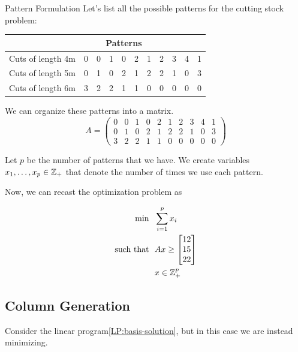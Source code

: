 \begin{example}{Pattern Formulation}{}
Let's list all the possible patterns for the cutting stock problem:

\begin{center}
\begin{tabular}{l|c|c|c|c|c|c|c|c|c|c}
& \multicolumn{7}{c}{Patterns}\\
\hline
Cuts of length 4m &0 &0 &1 &0 &2 &1 &2 &3 &4 & 1\\
 Cuts of length 5m   &    0 &1 &0 &2 &1 &2& 2& 1 &0&3 \\
 Cuts of length 6m   &    3& 2 &2 &1 &1 &0& 0& 0 &0 &0\\
 \hline
\end{tabular}
\end{center}

We can organize these patterns into a matrix.
\begin{equation}
A = 
\begin{pmatrix}
0 &0 &1 &0 &2 &1 &2 &3 &4 & 1\\
        0 &1 &0 &2 &1 &2& 2& 1 &0&3 \\
        3& 2 &2 &1 &1 &0& 0& 0 &0 &0
\end{pmatrix}
 \end{equation}
 
 Let $p$ be the number of patterns that we have.  We  create variables $x_1, \dots, x_p \in {\mathbb{Z}}_+$ that denote the number of times we use each pattern.

Now, we can recast the optimization problem as

\begin{align}
\min \ \ & \sum_{i=1}^p x_i \\
\mbox{such that} \ \ & Ax \geq \begin{bmatrix} 12 \\ 15 \\ 22\end{bmatrix}\\
& x \in {\mathbb{Z}}^p_+
\end{align}
 
\end{example}


\subsection{Column Generation}
Consider the linear program\eqref{LP:basis-solution}, but in this case we are instead minimizing.  


